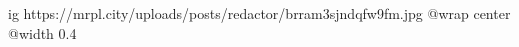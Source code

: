  
 
 
 
 

\ifcmt
  ig https://mrpl.city/uploads/posts/redactor/brram3sjndqfw9fm.jpg
  @wrap center
  @width 0.4
\fi
